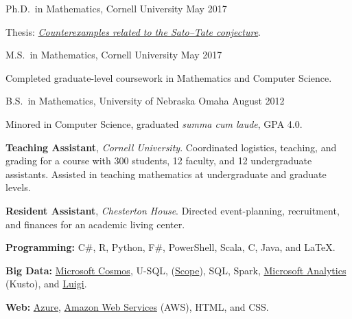 \documentclass[11pt, letterpaper]{awesome-cv}
\begin{document}

\begin{cventries}

\cventry
	{Ph.D.~in Mathematics, Cornell University}
	{}{}
	{May 2017}
	{
		\begin{cvitems}
			\item{Thesis: \href{http://doi.org/10.7298/X4PN93Q3}{\emph{Counterexamples related to the Sato--Tate conjecture}}.}
		\end{cvitems}
	}
	
\cventry
	{M.S.~in Mathematics, Cornell University}
	{}{}
	{May 2017}
	{
		\begin{cvitems}
			\item{Completed graduate-level coursework in Mathematics and Computer Science.}
		\end{cvitems}
	}
	
\cventry
	{B.S.~in Mathematics, University of Nebraska Omaha}
	{}{}
	{August 2012}
	{
		\begin{cvitems}
			\item{Minored in Computer Science, graduated \emph{summa cum laude}, GPA 4.0.}
		\end{cvitems}
	}
	
\end{cventries}






\begin{cvparagraph}
\textbf{Teaching Assistant}, \emph{Cornell University}. Coordinated logistics, teaching, and grading for a course with 300 students, 12 faculty, and 12 undergraduate assistants.
Assisted in teaching mathematics at undergraduate and graduate levels.

\textbf{Resident Assistant}, \emph{Chesterton House}. Directed event-planning, recruitment, and finances for an academic living center. 
\end{cvparagraph}






\begin{cvparagraph}
\textbf{Programming:} C\#, R, Python, F\#, PowerShell, Scala, C, Java, and \LaTeX.

\textbf{Big Data:}
\href{https://docs.microsoft.com/en-us/azure/cosmos-db/introduction}{Microsoft Cosmos}, 
U-SQL, 
(\href{https://doi.org/10.14778/1454159.1454166}{Scope}),
SQL,
Spark,
\href{https://docs.loganalytics.io/docs/Language-Reference}{Microsoft Analytics} (Kusto),
and 
\href{https://github.com/spotify/luigi}{Luigi}.

\textbf{Web:} 
\href{https://azure.microsoft.com/}{Azure}, 
\href{https://aws.amazon.com/}{Amazon Web Services} (AWS), 
HTML, and CSS.
\end{cvparagraph}
\end{document}
